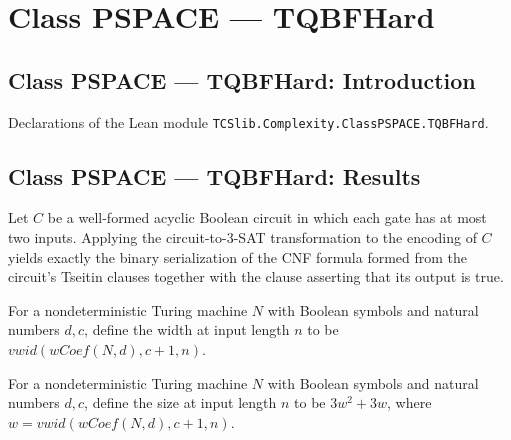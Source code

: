 \section{Class PSPACE --- TQBFHard}
\subsection*{Class PSPACE --- TQBFHard: Introduction}

Declarations of the Lean module \texttt{TCSlib.Complexity.ClassPSPACE.TQBFHard}.

\subsection*{Class PSPACE --- TQBFHard: Results}

\begin{theorem}
\label{Complexity.TQBFHard.dagCktSatToSAT3_encode}
\leanok
{}
Let $C$ be a well-formed acyclic Boolean circuit in which each gate has at most two
inputs. Applying the circuit-to-3-SAT transformation to the encoding of $C$ yields
exactly the binary serialization of the CNF formula formed from the circuit's Tseitin
clauses together with the clause asserting that its output is true.
\end{theorem}

\begin{definition}
\label{Complexity.TQBFHard.redW}
\leanok
{}
For a nondeterministic Turing machine $N$ with Boolean symbols and natural numbers
$d,c$, define the width at input length $n$ to be $vwid(wCoef(N,d),c+1,n)$.
\end{definition}

\begin{definition}
\label{Complexity.TQBFHard.redM}
\leanok
{}
For a nondeterministic Turing machine $N$ with Boolean symbols and natural numbers
$d,c$, define the size at input length $n$ to be $3w^2+3w$, where
$w=vwid(wCoef(N,d),c+1,n)$.
\end{definition}

